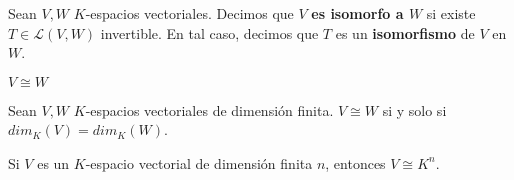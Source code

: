 \begin{definition}{}{}
    Sean $V,W$ $K$-espacios vectoriales. Decimos que $V$ \textbf{es isomorfo a $W$} si existe $T \in \mathcal{L}(V,W)$ invertible. En tal caso, decimos que $T$ es un \textbf{isomorfismo} de $V$ en $W$.
\begin{notation}{}{}
        $V \cong W$
\end{notation}
\end{definition}
\begin{theorem}{}{}
    Sean $V,W$ $K$-espacios vectoriales de dimensión finita. $V \cong W$ si y solo si $dim_K(V) = dim_K(W)$.
\end{theorem}
\begin{corollary}{}{}
    Si $V$ es un $K$-espacio vectorial de dimensión finita $n$, entonces $V \cong K^n$.
\end{corollary} 